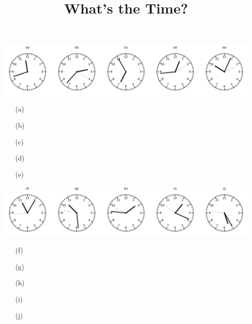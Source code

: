 \documentclass[a4paper, 11pt]{article}
\title{What's the Time?}
\date{}
\author{}
\begin{document}
\maketitle

\includegraphics[width=\textwidth]{clocks_3_0.pdf}
\begin{enumerate}\item[(a)] \dotfill\bigskip
\item[(b)] \dotfill\bigskip
\item[(c)] \dotfill\bigskip
\item[(d)] \dotfill\bigskip
\item[(e)] \dotfill\bigskip
\end{enumerate}\includegraphics[width=\textwidth]{clocks_3_1.pdf}
\begin{enumerate}\item[(f)] \dotfill\bigskip
\item[(g)] \dotfill\bigskip
\item[(h)] \dotfill\bigskip
\item[(i)] \dotfill\bigskip
\item[(j)] \dotfill\bigskip
\end{enumerate}
\end{document}
